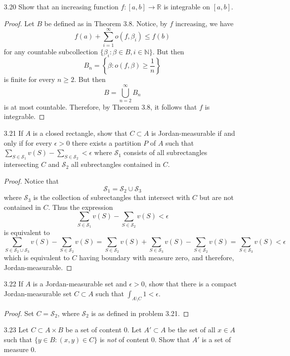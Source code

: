 \begin{enumerate}
    \item[3.20] Show that an increasing function \( f:[a,b] \rightarrow \mathbb{R} \) is integrable on \( [a,b] \).
    
    \begin{proof}
    Let \( B \) be defined as in Theorem 3.8. Notice, by \( f \) increasing, we have 
    \[
    f(a) + \sum_{i=1}^\infty o(f,\beta_i) \leq f(b)
    \]
    for any countable subcollection \( \{ \beta_i: \beta \in B, i \in \mathbb{N} \} \). But then
    \[
    B_n = \left\{ \beta : o(f,\beta) \geq \frac{1}{n} \right\}
    \]
    is finite for every \( n \geq 2 \). But then
    \[
    B = \bigcup_{n=2}^\infty B_n
    \]
    is at most countable. Therefore, by Theorem 3.8, it follows that \( f \) is integrable.
    \end{proof}
    
    \item[3.21] If \( A \) is a closed rectangle, show that \( C \subset A \) is Jordan-measurable if and only if for every \( \epsilon > 0 \) there exists a partition \( P \) of \( A \) such that \( \sum_{S \in \mathcal{S}_1} v(S) - \sum_{S \in \mathcal{S}_2} < \epsilon \) where \( \mathcal{S}_1 \) consists of all subrectangles intersecting \( C \) and \( \mathcal{S}_2 \) all subrectangles contained in \( C \).
    
    \begin{proof}
    Notice that 
    \[
    \mathcal{S}_1 = \mathcal{S}_2 \cup \mathcal{S}_3
    \]
    where \( \mathcal{S}_3 \) is the collection of subrectangles that intersect with \( C \) but are not contained in \( C \). Thus the expression
    \[
    \sum_{S \in \mathcal{S}_1} v(S) - \sum_{S \in \mathcal{S}_2} v(S) < \epsilon
    \]
    is equivalent to
    \[
    \sum_{S \in \mathcal{S}_2 \cup \mathcal{S}_3} v(S) - \sum_{S \in \mathcal{S}_2} v(S) =  \sum_{S \in \mathcal{S}_2} v(S) + \sum_{S \in \mathcal{S}_3} v(S) - \sum_{S \in \mathcal{S}_2} v(S) = \sum_{S \in \mathcal{S}_3} v(S) < \epsilon
    \]
    which is equivalent to \( C \) having boundary with measure zero, and therefore, Jordan-measurable.
    \end{proof}
    
    \item[3.22] If \( A \) is a Jordan-measurable set and \( \epsilon > 0 \), show that there is a compact Jordan-measurable set \( C \subset A \) such that \( \int_{A\setminus C}1 < \epsilon \).
    
    \begin{proof}
    Set \( C = \mathcal{S}_2 \), where \( \mathcal{S}_2 \) is as defined in problem 3.21.
    \end{proof}
    
    \item[3.23] Let \( C \subset A \times B \) be a set of content \( 0 \). Let \( A' \subset A \) be the set of all \( x \in A \) such that \( \{ y \in B: (x,y) \in C \} \) is \emph{not} of content \( 0 \). Show that \( A' \) is a set of measure \( 0 \). 
    
\end{enumerate}